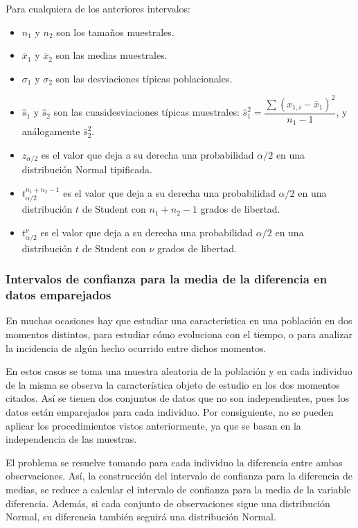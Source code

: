 Para cualquiera de los anteriores intervalos:
\begin{itemize}[label=--]
\item $n_{1}$ y $n_{2}$ son los tamaños muestrales.
\item $\overline{x}_{1}$ y $\overline{x}_{2}$ son las medias muestrales.
\item $\sigma_{1} $ y $\sigma_{2} $ son las desviaciones típicas
poblacionales.
\item $\hat s_{1}$ y $\hat s_{2}$ son las cuasidesviaciones típicas muestrales: $\hat s_{1}^{2}=
\dfrac{\sum \left( x_{1,i}-\overline{x}_{1}\right) ^{2}}{n_{1}-1}$, y análogamente $\hat s_{2}^{2}$.
\item $z_{\alpha /2}$ es el valor que deja a su derecha una probabilidad $\alpha /2 $ en una distribución Normal
tipificada.
\item $t_{\alpha /2}^{n_{1}+n_{2}-1}$ es el valor que deja a su derecha una probabilidad $\alpha /2$ en una
distribución $t$ de Student con $n_{1}+n_{2}-1$ grados de libertad.
\item $t_{\alpha /2}^{\nu}$ es el valor que deja a su derecha una probabilidad $\alpha /2$ en una distribución $t$ de
Student con $\nu$ grados de libertad.
\end{itemize}

\subsubsection {Intervalos de confianza para la media de la diferencia en datos emparejados}
En muchas ocasiones hay que estudiar una característica en una población en dos momentos distintos, para estudiar cómo
evoluciona con el tiempo, o para analizar la incidencia de algún hecho ocurrido entre dichos momentos.

En estos casos se toma una muestra aleatoria de la población y en cada individuo de la misma se observa la característica
objeto de estudio en los dos momentos citados. Así se tienen dos conjuntos de datos que no son independientes, pues los
datos están emparejados para cada individuo. Por consiguiente, no se pueden aplicar los procedimientos vistos
anteriormente, ya que se basan en la independencia de las muestras.

El problema se resuelve tomando para cada individuo la diferencia entre ambas observaciones. Así, la construcción del
intervalo de confianza para la diferencia de medias, se reduce a calcular el intervalo de confianza para la media de la
variable diferencia. Además, si cada conjunto de observaciones sigue una distribución Normal, su diferencia también
seguirá una distribución Normal.

